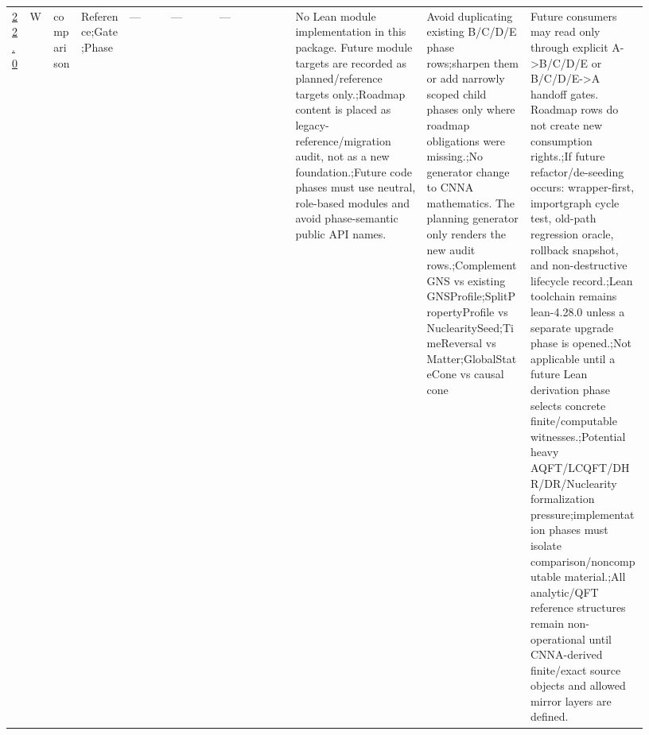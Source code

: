 \begin{longtable}{L{0.026\linewidth} L{0.024\linewidth} L{0.045\linewidth} L{0.07\linewidth} L{0.065\linewidth} L{0.075\linewidth} L{0.11\linewidth} L{0.19\linewidth} L{0.155\linewidth} L{0.17\linewidth}}
\hline
\addlinespace[0.24em]
\hyperlink{phase-row-22-0}{22.0} & W & comparison & Reference;\newline Gate;\newline Phase & --- & --- & --- & No Lean module implementation in this package. Future module targets are recorded as planned/\allowbreak{}reference targets only.;\newline Roadmap content is placed as legacy-reference/\allowbreak{}migration audit, not as a new foundation.;\newline Future code phases must use neutral, role-based modules and avoid phase-semantic public API names. & Avoid duplicating existing B/\allowbreak{}C/\allowbreak{}D/\allowbreak{}E phase rows;\newline sharpen them or add narrowly scoped child phases only where roadmap obligations were missing.;\newline No generator change to CNNA mathematics. The planning generator only renders the new audit rows.;\newline ComplementGNS vs existing GNSProfile;\newline SplitPropertyProfile vs NuclearitySeed;\newline TimeReversal vs Matter;\newline GlobalStateCone vs causal cone & Future consumers may read only through explicit A->B/\allowbreak{}C/\allowbreak{}D/\allowbreak{}E or B/\allowbreak{}C/\allowbreak{}D/\allowbreak{}E->A handoff gates. Roadmap rows do not create new consumption rights.;\newline If future refactor/\allowbreak{}de-seeding occurs: wrapper-first, importgraph cycle test, old-path regression oracle, rollback snapshot, and non-destructive lifecycle record.;\newline Lean toolchain remains lean-4.28.0 unless a separate upgrade phase is opened.;\newline Not applicable until a future Lean derivation phase selects concrete finite/\allowbreak{}computable witnesses.;\newline Potential heavy AQFT/\allowbreak{}LCQFT/\allowbreak{}DHR/\allowbreak{}DR/\allowbreak{}Nuclearity formalization pressure;\newline implementation phases must isolate comparison/\allowbreak{}noncomputable material.;\newline All analytic/\allowbreak{}QFT reference structures remain non-operational until CNNA-derived finite/\allowbreak{}exact source objects and allowed mirror layers are defined.\\

\end{longtable}
